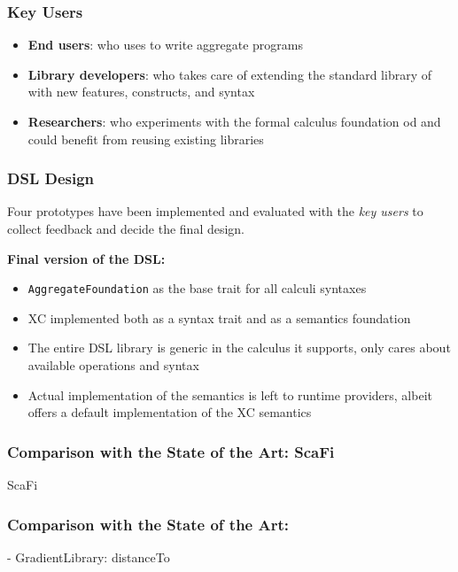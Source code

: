 \begin{frame}
    \frametitle{Key Users}
    \begin{itemize}
        \item \textbf{End users}: who uses \this to write aggregate programs
        \item \textbf{Library developers}: who takes care of extending the standard library of \this with new features, constructs, and syntax
        \item \textbf{Researchers}: who experiments with the formal calculus foundation od \this and could benefit from reusing existing libraries
    \end{itemize}
\end{frame}

\begin{frame}
    \frametitle{\ac{DSL} Design}
    Four prototypes have been implemented and evaluated with the \textit{key users} to collect feedback and decide the final design.
    
    \textbf{Final version of the \ac{DSL}:}
    \begin{itemize}
        \item \texttt{AggregateFoundation} as the base trait for all calculi syntaxes
        \item \ac{XC} implemented both as a syntax trait and as a semantics foundation
        \item The entire \ac{DSL} library is generic in the calculus it supports, only cares about available operations and syntax
        \item Actual implementation of the semantics is left to runtime providers, albeit \this offers a default implementation of the \ac{XC} semantics
    \end{itemize}
\end{frame}

\begin{frame}
    \frametitle{Comparison with the State of the Art: ScaFi}
    \begin{exampleblock}{ScaFi}
        
    \end{exampleblock}
\end{frame}

\begin{frame}
    \frametitle{Comparison with the State of the Art: \this}
    \begin{exampleblock}{\this - GradientLibrary: distanceTo}
        
    \end{exampleblock}
\end{frame}

